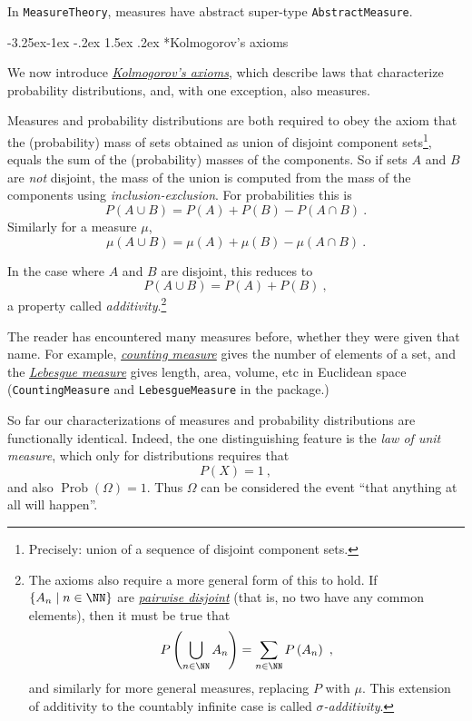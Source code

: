 \documentclass{juliacon}
\makeatletter
\renewcommand\subsection{\@startsection{subsection}{2}{\z@}%
{-3.25ex\@plus -1ex \@minus -.2ex}%
{1.5ex \@plus .2ex}%
{\normalfont\bfseries}}
\makeatother
\begin{document}
In \verb|MeasureTheory|, measures have abstract super-type \verb|AbstractMeasure|. 


\subsection*{Kolmogorov's axioms}

We now introduce \href{https://en.wikipedia.org/wiki/Probability_axioms}{\emph{Kolmogorov's axioms}}, which describe laws that characterize probability distributions, and, with one exception, also measures. 

Measures and probability distributions are both required to obey the axiom that the (probability) mass of sets obtained as union of disjoint component sets\footnote{Precisely: union of a sequence of disjoint component sets.}, equals the sum of the (probability) masses of the components. So if sets $A$ and $B$ are \emph{not} disjoint, the mass of the union is computed from the mass of the components using \emph{inclusion-exclusion}. For probabilities this is
\[
P(A \cup B) = P(A) + P(B) - P(A \cap B)\ .
\]
Similarly for a measure $\mu$,
\[
\mu(A \cup B) = \mu(A) + \mu(B) - \mu(A \cap B)\ .
\]

In the case where $A$ and $B$ are disjoint, this reduces to 
\[
P(A \cup B) = P(A) + P(B)\ ,
\]
a property called \emph{additivity}.\footnote{The axioms also require a more general form of this to hold. If $\left\{A_n \mid n\in\NN\right\}$ are \href{https://en.wikipedia.org/wiki/Disjoint_sets}{\emph{pairwise disjoint}} (that is, no two have any common elements), 
then it must be true that
\[
P\left(\bigcup_{n\in\NN} A_n\right)
= \sum_{n\in\NN} P\left(A_n\right)\ ,
\]
and similarly for more general measures, replacing $P$ with $\mu$.
This extension of additivity to the countably infinite case is called \emph{$\sigma$-additivity}.}

The reader has encountered many measures before, whether they were given that name. For example, \href{https://en.wikipedia.org/wiki/Counting_measure}{\emph{counting measure}} gives the number of elements of a set, and the \href{https://en.wikipedia.org/wiki/Lebesgue_measure}{\emph{Lebesgue measure}} gives length, area, volume, etc in Euclidean space (\verb|CountingMeasure| and \verb|LebesgueMeasure| in the package.)


So far our characterizations of measures and probability distributions are functionally identical. Indeed, the one distinguishing feature is the \emph{law of unit measure}, which  only for distributions requires that
\[
P(X) = 1\ ,
\]
and also $\operatorname{Prob}(\Omega) = 1$.
Thus $\Omega$ can be considered the event ``that anything at all will happen''.
\end{document}
